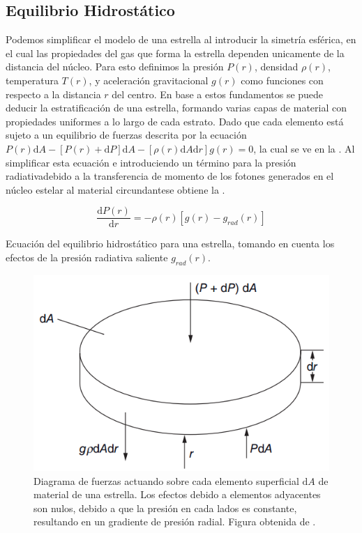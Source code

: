 \subsection{Equilibrio Hidrostático}

Podemos simplificar el modelo de una estrella al introducir la simetría
esférica, en el cual las propiedades del gas que forma la estrella dependen
unicamente de la distancia del núcleo. Para esto definimos la presión $P(r)$,
densidad $\rho (r)$, temperatura $T(r)$, y aceleración gravitacional $g(r)$ como
funciones con respecto a la distancia $r$ del centro. En base a estos
fundamentos se puede deducir la estratificación de una estrella, formando varias
capas de material con propiedades uniformes a lo largo de cada estrato. Dado que
cada elemento está sujeto a un equilibrio de fuerzas descrita por la ecuación
$P(r) \mathrm{d}A - [P(r) + \mathrm{d}P] \mathrm{d}A - [\rho(r) \mathrm{d}A
\mathrm{d}r] g(r) = 0$, la cual se ve en la
. Al simplificar esta ecuación e
introduciendo un término para la presión radiativa\textemdash debido a la
transferencia de momento de los fotones generados en el núcleo estelar al
material circundante\textemdash se obtiene la
. 

\begin{eqfloat}[!ht]
	\centering
	\begin{equation}
		\frac{\textrm{d}P(r)}{\textrm{d}r} = -\rho(r) [g(r) - g_{rad}(r)]
	\end{equation}
	\caption{Ecuación del equilibrio hidrostático para una estrella, tomando en
	cuenta los efectos de la presión radiativa saliente $g_{rad}(r)$.
	}
	\label{ecuacionEquilibrioHistrostatico}
\end{eqfloat}

\begin{figure}[!ht]
	\centering
	\includegraphics[scale=0.5]{Introduccion/Figures/EquilibrioHidrostatico_LeBlanc.png}
	\caption{Diagrama de fuerzas actuando sobre cada elemento superficial
	$\mathrm{d}A$ de material de una estrella. Los efectos debido a elementos
	adyacentes son nulos, debido a que la presión en cada lados es constante,
	resultando en un gradiente de presión radial. Figura obtenida de
	.}
	\label{figuraEquilibrioHidrostatico}
\end{figure}

